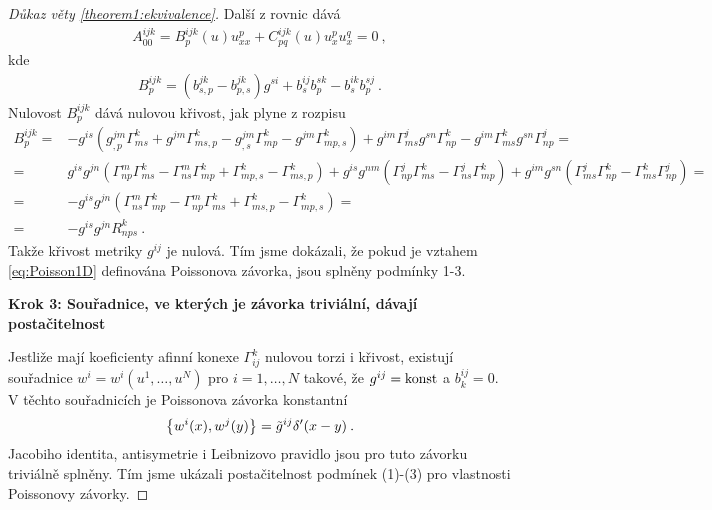 \begin{proof}[Důkaz věty \ref{theorem1:ekvivalence}]
   Další z rovnic dává
    \begin{align}
        A_{00}^{ijk} = B^{ijk}_p(u) u^p_{xx} + C^{ijk}_{pq}(u) u^p_x u^q_x = 0 \:,
    \end{align}
    kde 
    \begin{align}
        B^{ijk}_p 
        = (b^{jk}_{s,p} - b^{jk}_{p,s}) g^{si} + b_s^{ij} b_p^{sk} - b_s^{ik} b_p^{sj} \:.
    \end{align}
    Nulovost $B^{ijk}_p$ dává nulovou křivost, jak plyne z rozpisu
    \begin{align}
        B^{ijk}_p  
        =& -g^{is} \left( g^{jm}_{,p} \Gamma^k_{ms} + g^{jm} \Gamma^k_{ms,p} - g^{jm}_{,s} \Gamma^k_{mp} - g^{jm} \Gamma^k_{mp,s} \right) + g^{im} \Gamma^j_{ms} g^{sn} \Gamma^{k}_{np} - g^{im} \Gamma^k_{ms} g^{sn} \Gamma^j_{np}
        = \\ =& g^{is} g^{jn} \left( \Gamma^m_{np} \Gamma^k_{ms} - \Gamma^{m}_{ns} \Gamma^k_{mp} + \Gamma^{k}_{mp,s} -  \Gamma^{k}_{ms,p} \right) + g^{is} g^{nm} \left( \Gamma^j_{np} \Gamma^{k}_{ms} - \Gamma^j_{ns} \Gamma^k_{mp} \right) + g^{im} g^{sn} \left( \Gamma^j_{ms} \Gamma^k_{np} - \Gamma^k_{ms} \Gamma^j_{np} \right)
        = \\ =& -g^{is} g^{jn} \left( \Gamma^{m}_{ns} \Gamma^k_{mp}  - \Gamma^m_{np} \Gamma^k_{ms} + \Gamma^{k}_{ms,p} - \Gamma^{k}_{mp,s} \right)
        = \\ =& -g^{is} g^{jn} R^k_{nps} \:.
    \end{align}
    Takže křivost metriky $g^{ij}$ je nulová. Tím jsme dokázali, že pokud je vztahem \eqref{eq:Poisson1D} definována Poissonova závorka, jsou splněny podmínky 1-3.

    \textbf{Krok 3: Souřadnice, ve kterých je závorka triviální, dávají postačitelnost}

    Jestliže mají koeficienty afinní konexe $\Gamma_{ij}^k$ nulovou torzi i křivost, existují souřadnice $w^i=w^i(u^1,\dots,u^N)$ pro $i=1,\dots,N$ takové, že $g^{ij} = \mathrm{konst}$ a $b^{ij}_k = 0$. V těchto souřadnicích je Poissonova závorka konstantní
    \begin{align}
        \left \lbrace w^i(x),w^j(y) \right \rbrace = \tilde{g}^{ij} \delta'(x-y) \:.
    \end{align}
    Jacobiho identita, antisymetrie i Leibnizovo pravidlo jsou pro tuto závorku triviálně splněny. Tím jsme ukázali postačitelnost podmínek (1)-(3) pro vlastnosti Poissonovy závorky.
\end{proof}

